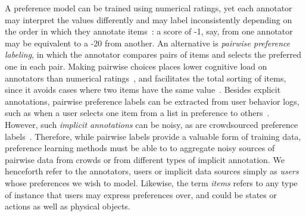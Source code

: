 A preference model can be trained using numerical ratings, yet 
each annotator may interpret the values differently and may label inconsistently depending on the order in which they annotate items~\citep{ovadia2004ratings,yannakakis2011ranking}: 
a score of -1, say, from one annotator may be equivalent to a -20 from another. 
An alternative is \emph{pairwise preference labeling}, 
in which the annotator compares pairs of items and selects the preferred one in each pair.
Making pairwise choices places lower cognitive load on annotators than numerical ratings~\citep{yang2011ranking},
and facilitates the total sorting of items, since it avoids cases where two items have the same value~\citep{kendall1948rank,kingsley2010preference}.
Besides explicit annotations, pairwise preference labels can be extracted from
user behavior logs, such as when a user selects one item from a list in preference
to others~\citep{joachims2002optimizing}. 
However, such \emph{implicit annotations} can be noisy, as are crowdsourced preference labels~\citep{habernal2016argument}.
Therefore, while pairwise labels provide a valuable
form of training data, preference learning methods must be able to 
to aggregate noisy sources of pairwise data from crowds 
or from different types of implicit annotation.
We henceforth refer to the annotators, users or implicit data sources simply as \emph{users}
whose preferences we wish to model.
Likewise, the term \emph{items} refers to any type of instance that users may express preferences over,
and could be states or actions as well as physical objects.

